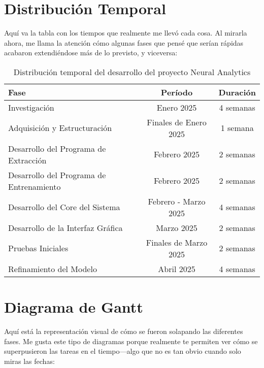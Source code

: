 \section{Distribución Temporal}

Aquí va la tabla con los tiempos que realmente me llevó cada cosa. Al mirarla ahora, me llama la atención cómo algunas fases que pensé que serían rápidas acabaron extendiéndose más de lo previsto, y viceversa:

\begin{table}[ht]
    \centering
    \begin{tabular}{|l|c|c|}
        \hline
        \textbf{Fase} & \textbf{Período} & \textbf{Duración} \\
        \hline
        Investigación & Enero 2025 & 4 semanas \\
        \hline
        Adquisición y Estructuración & Finales de Enero 2025 & 1 semana \\
        \hline
        Desarrollo del Programa de Extracción & Febrero 2025 & 2 semanas \\
        \hline
        Desarrollo del Programa de Entrenamiento & Febrero 2025 & 2 semanas \\
        \hline
        Desarrollo del Core del Sistema & Febrero - Marzo 2025 & 4 semanas \\
        \hline
        Desarrollo de la Interfaz Gráfica & Marzo 2025 & 2 semanas \\
        \hline
        Pruebas Iniciales & Finales de Marzo 2025 & 2 semanas \\
        \hline
        Refinamiento del Modelo & Abril 2025 & 4 semanas \\
        \hline
    \end{tabular}
    \caption{Distribución temporal del desarrollo del proyecto Neural Analytics}
    \label{tab:temporal_distribution}
\end{table}

\newpage
\section{Diagrama de Gantt}

Aquí está la representación visual de cómo se fueron solapando las diferentes fases. Me gusta este tipo de diagramas porque realmente te permiten ver cómo se superpusieron las tareas en el tiempo—algo que no es tan obvio cuando solo miras las fechas:

